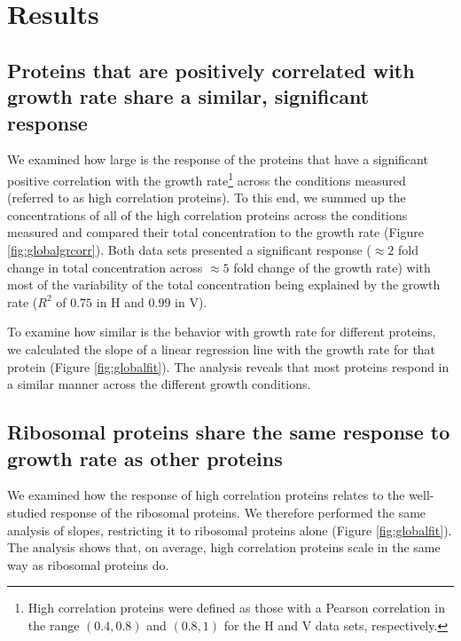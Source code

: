 \documentclass[a4paper,landscape,titlepage,17pt]{extarticle}
\begin{document}
\clearpage        
\section*{\LARGE Results}
\subsection*{Proteins that are positively correlated with growth rate share a similar, significant response}
We examined how large is the response of the proteins that have a significant positive correlation with the growth rate\footnote{High correlation proteins were defined as those with a Pearson correlation in the range $(0.4,0.8)$ and $(0.8,1)$ for the H and V data sets, respectively.} across the conditions measured (referred to as high correlation proteins).
To this end, we summed up the concentrations of all of the high correlation proteins across the conditions measured and compared their total concentration to the growth rate (Figure \ref{fig:globalgrcorr}).
Both data sets presented a significant response ($\approx 2$ fold change in total concentration across $\approx 5$ fold change of the growth rate) with most of the variability of the total concentration being explained by the growth rate ($R^2$ of $0.75$ in H and $0.99$ in V). 

To examine how similar is the behavior with growth rate for different proteins, we calculated the slope of a linear regression line with the growth rate for that protein (Figure \ref{fig:globalfit}).
The analysis reveals that most proteins respond in a similar manner across the different growth conditions.

\subsection*{Ribosomal proteins share the same response to growth rate as other proteins}
We examined how the response of high correlation proteins relates to the well-studied response of the ribosomal proteins.
We therefore performed the same analysis of slopes, restricting it to ribosomal proteins alone (Figure \ref{fig:globalfit}).
The analysis shows that, on average, high correlation proteins scale in the same way as ribosomal proteins do.
\clearpage        
\end{document}
